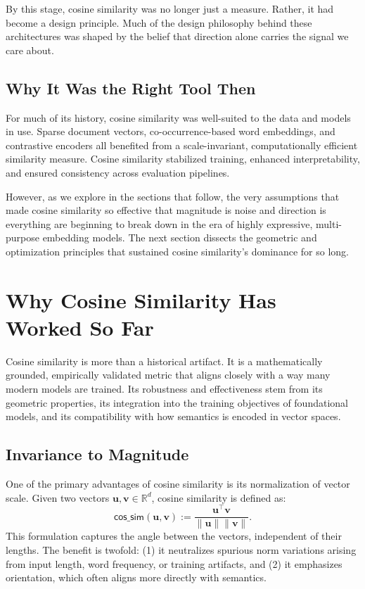 \documentclass[11pt]{article}
\newcommand{\bfu}{\boldsymbol{u}}
\newcommand{\bfv}{\boldsymbol{v}}
\newcommand{\bbR}{\mathbb{R}}
\newcommand{\cossim}{\textsf{cos\_sim}}
\begin{document}
By this stage, cosine similarity was no longer just a measure. Rather, it had become a design principle. Much of the design philosophy behind these architectures was shaped by the belief that direction alone carries the signal we care about.


\subsection{Why It Was the Right Tool Then}

For much of its history, cosine similarity was well-suited to the data and models in use. Sparse document vectors, co-occurrence-based word embeddings, and contrastive encoders all benefited from a scale-invariant, computationally efficient similarity measure. Cosine similarity stabilized training, enhanced interpretability, and ensured consistency across evaluation pipelines.

However, as we explore in the sections that follow, the very assumptions that made cosine similarity so effective that magnitude is noise and direction is everything are beginning to break down in the era of highly expressive, multi-purpose embedding models. The next section dissects the geometric and optimization principles that sustained cosine similarity's dominance for so long.


\section{Why Cosine Similarity Has Worked So Far}\label{sec:success}

Cosine similarity is more than a historical artifact. It is a mathematically grounded, empirically validated metric that aligns closely with a way many modern models are trained. Its robustness and effectiveness stem from its geometric properties, its integration into the training objectives of foundational models, and its compatibility with how semantics is encoded in vector spaces. 

\subsection{Invariance to Magnitude}

One of the primary advantages of cosine similarity is its normalization of vector scale. Given two vectors $\bfu, \bfv \in \bbR^d$, cosine similarity is defined as:
\begin{equation*}
\cossim(\bfu, \bfv) := \frac{\bfu^\top \bfv}{\|\bfu\|\|\bfv\|}.
\end{equation*}
This formulation captures the angle between the vectors, independent of their lengths. The benefit is twofold: (1) it neutralizes spurious norm variations arising from input length, word frequency, or training artifacts, and (2) it emphasizes orientation, which often aligns more directly with semantics.
\end{document}
